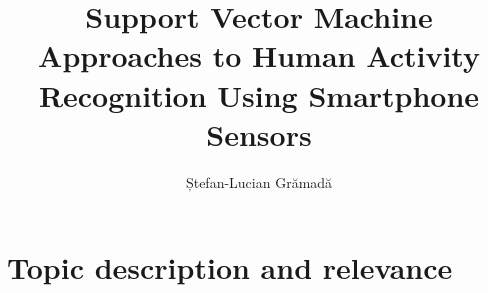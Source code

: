 \documentclass[3p,times,procedia]{elsarticle}
\begin{document}
\begin{frontmatter}



%


\title{\textbf{Support Vector Machine Approaches to Human Activity Recognition Using Smartphone Sensors}}




\author{Ștefan-Lucian Grămadă}

\address{Department of Computer Science, Babe\c s-Bolyai University\\1, M. Kog\u alniceanu Street, 400084, Cluj-Napoca, Romania\\E-mail: stefan.gramada@stud.ubbcluj.ro}


\end{frontmatter}






\section*{Topic description and relevance}\label{topic}
\end{document}
